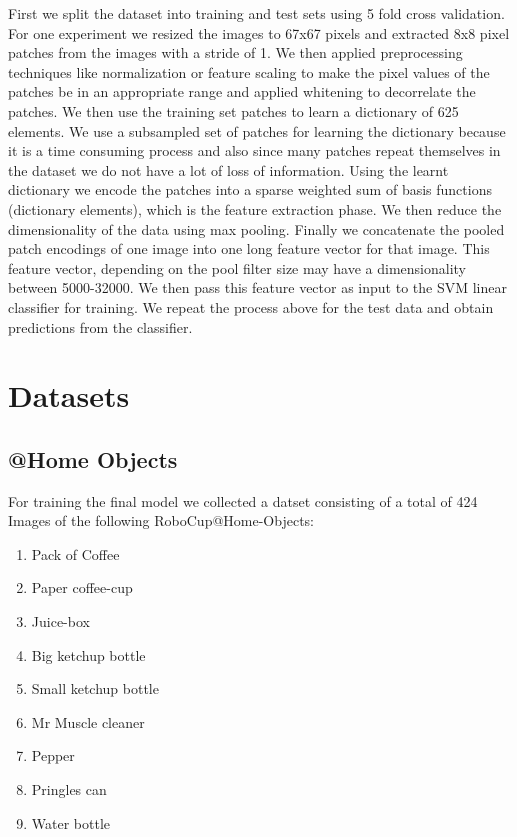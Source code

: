 \documentclass[	DIV=calc,%
				paper=a4,%
				fontsize=11pt,%
				twocolumn]{scrartcl}	 %
\begin{document}
First we split the dataset into training and test sets using 5 fold cross validation. For one experiment we resized the images to 67x67 pixels and extracted 8x8 pixel patches from the images with a stride of 1. We then applied preprocessing techniques like normalization or feature scaling to make the pixel values of the patches be in an appropriate range and applied whitening to decorrelate the patches. We then use the training set patches to learn a dictionary of 625 elements. We use a subsampled set of patches for learning the dictionary because it is a time consuming process and also since many patches repeat themselves in the dataset we do not have a lot of loss of information. Using the learnt dictionary we encode the patches into a sparse weighted sum of basis functions (dictionary elements), which is the feature extraction phase. We then reduce the dimensionality of the data using max pooling. Finally we concatenate the pooled patch encodings of one image into one long feature vector for that image. This feature vector, depending on the pool filter size may have a dimensionality between 5000-32000. We then pass this feature vector as input to the SVM linear classifier for training. We repeat the process above for the test data and obtain predictions from the classifier.


\section{Datasets}
\subsection*{@Home Objects}
For training the final model we collected a datset consisting of a total of 424 Images of the following RoboCup@Home-Objects:
\begin{enumerate}
    \item Pack of Coffee
    \item Paper coffee-cup
    \item Juice-box
    \item Big ketchup bottle
    \item Small ketchup bottle
    \item Mr Muscle cleaner
    \item Pepper
    \item Pringles can
    \item Water bottle
\end{enumerate}
\end{document}
